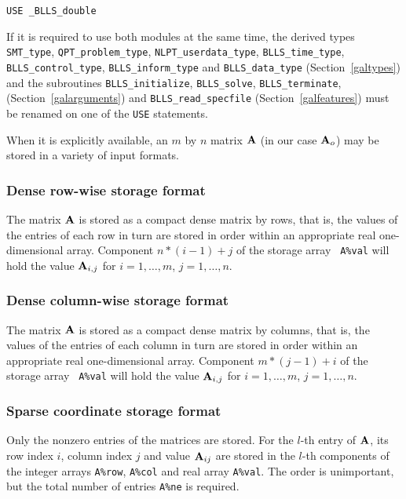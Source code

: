 \documentclass{galahad}
\newcommand{\packagename}{BLLS}
\newcommand{\fullpackagename}{\libraryname\_\packagename}
\begin{document}
\medskip{}

\hspace{8mm} {\tt USE  \fullpackagename\_double}

\medskip

\noindent
If it is required to use both modules at the same time, the derived types
{\tt SMT\_type},
{\tt QPT\_problem\_type},
{\tt NLPT\_userdata\-\_type},
{\tt \packagename\_time\_type},
{\tt \packagename\_control\_type},
{\tt \packagename\_inform\_type}
and
{\tt \packagename\_data\_type}
(Section~\ref{galtypes})
and the subroutines
{\tt \packagename\_initialize},
{\tt \packagename\_\-solve},
{\tt \packagename\_terminate},
(Section~\ref{galarguments})
and
{\tt \packagename\_read\_specfile}
(Section~\ref{galfeatures})
must be renamed on one of the {\tt USE} statements.


\galmatrix
When it is explicitly available, an $m$ by $n$ matrix ${\mathbf{A}}$ 
(in our case ${\mathbf{A}}_o$) may be stored in a variety of input formats.

\subsubsection{Dense row-wise storage format}\label{dense-row}
The matrix ${\mathbf{A}}$ is stored as a compact dense matrix by rows,
that is, the values of the entries of each row in turn are
stored in order within an appropriate real one-dimensional array.
Component $n \ast (i-1) + j$ of the storage array {\tt
  A\%val} will hold the value ${\mathbf{A}}_{i,j}$ for $i = 1, \ldots , m$, $j =
1, \ldots , n$.

\subsubsection{Dense column-wise storage format}\label{dense-column}
The matrix ${\mathbf{A}}$ is stored as a compact
dense matrix by columns, that is, the values of the entries of each column
in turn are stored in order within an appropriate real one-dimensional array.
Component $m \ast (j-1) + i$ of the storage array {\tt
  A\%val} will hold the value ${\mathbf{A}}_{i,j}$ for $i = 1, \ldots , m$, $j =
1, \ldots , n$.

\subsubsection{Sparse coordinate storage format}\label{coordinate}
Only the nonzero entries of the matrices are stored. For the $l$-th
entry of ${\mathbf{A}}$, its row index $i$, column index $j$ and value
${\mathbf{A}}_{ij}$ are stored in the $l$-th components of the integer arrays
{\tt A\%row}, {\tt A\%col} and real array {\tt A\%val}.
The order is unimportant, but the total number of entries {\tt A\%ne} is
required.
\end{document}
